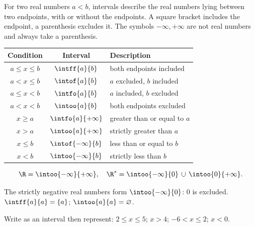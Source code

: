 \begin{keypoint}[Notation]
For two real numbers $a<b$, intervals describe the real numbers lying between two endpoints, with or without the endpoints. A square bracket includes the endpoint, a parenthesis excludes it. The symbols $-\infty,+\infty$ are not real numbers and always take a parenthesis.
\end{keypoint}
\begin{center}\begin{tabular}{c|c|l}
\textbf{Condition}&\textbf{Interval}&\textbf{Description}\\\hline
$a\leq x\leq b$&$\intff{a}{b}$&both endpoints included\\
$a<x\leq b$&$\intof{a}{b}$&$a$ excluded, $b$ included\\
$a\leq x<b$&$\intfo{a}{b}$&$a$ included, $b$ excluded\\
$a<x<b$&$\intoo{a}{b}$&both endpoints excluded\\
$x\geq a$&$\intfo{a}{+\infty}$&greater than or equal to $a$\\
$x>a$&$\intoo{a}{+\infty}$&strictly greater than $a$\\
$x\leq b$&$\intof{-\infty}{b}$&less than or equal to $b$\\
$x<b$&$\intoo{-\infty}{b}$&strictly less than $b$
\end{tabular}\end{center}
\[\R=\intoo{-\infty}{+\infty},\quad \R^*=\intoo{-\infty}{0}\,\cup\,\intoo{0}{+\infty}.\]
\begin{pitfall}The strictly negative real numbers form $\intoo{-\infty}{0}$: $0$ is excluded. $\intff{a}{a}=\{a\}$; $\intoo{a}{a}=\varnothing$.\end{pitfall}
\begin{example}Write as an interval then represent: $2\leq x\leq5$; $x>4$; $-6<x\leq2$; $x<0$.\end{example}

